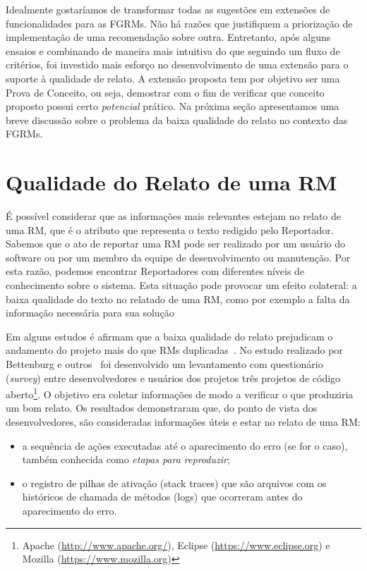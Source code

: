 Idealmente gostaríamos de transformar todas as sugestões em extensões de
funcionalidades para as FGRMs. Não há razões que justifiquem a priorização de
implementação de uma recomendação sobre outra. Entretanto, após alguns ensaios e
combinando de maneira mais intuitiva do que seguindo um fluxo de critérios,  foi
investido mais esforço no desenvolvimento de uma extensão para o suporte à
qualidade de relato. A extensão proposta tem por objetivo ser uma Prova de
Conceito, ou seja, demostrar com o fim de verificar que conceito proposto possui
certo \textit{potencial} prático. Na próxima seção apresentamos uma breve
discussão sobre o problema da baixa qualidade do relato no contexto das FGRMs.

\section{Qualidade do Relato de uma RM}
\label{sec:avaliando_a_qualidade_do_relato_de_uma_rm}

É possível considerar que as informações mais relevantes estejam no relato de
uma RM, que é o atributo que representa o texto redigido pelo Reportador.
Sabemos que o ato de reportar uma RM pode ser realizado por um usuário do
software ou por um membro da equipe de desenvolvimento ou manutenção. Por esta
razão, podemos encontrar Reportadores com diferentes níveis de conhecimento
sobre o sistema. Esta situação pode provocar um efeito colateral: a baixa
qualidade do texto no relatado de uma RM, como por exemplo a falta da informação
necessária para sua solução

Em alguns estudos é afirmam que a baixa qualidade do relato prejudicam o
andamento do projeto mais do que RMs duplicadas~\cite{bettenburg2007quality}. No
estudo realizado por Bettenburg e outros~\cite{bettenburg2008makes} foi
desenvolvido um levantamento com questionário (\textit{survey}) entre
desenvolvedores e usuários dos projetos três projetos de código
aberto\footnote{Apache (\url{http://www.apache.org/}), Eclipse
    (\url{https://www.eclipse.org}) e Mozilla (\url{https://www.mozilla.org})}.
O objetivo era coletar informações de modo a verificar o que produziria um bom
relato. Os resultados demonstraram que, do ponto de vista dos
desenvolvedores, são consideradas informações úteis e
estar no relato de uma RM\@:

\begin{itemize}
    \item a sequência de ações executadas até o aparecimento do erro (se for o
        caso), também conhecida como \textit{etapas para reproduzir};
    \item o registro de pilhas de ativação (stack traces) que são arquivos com
        os históricos de chamada de métodos (logs) que ocorreram antes do
        aparecimento do erro.
\end{itemize}

